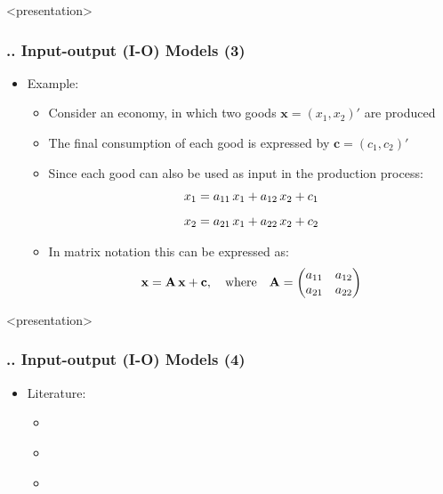 \documentclass[11pt,aspectratio=169]{beamer}
\begin{document}
\begin{frame}<presentation>
	\frametitle{{\thesection.\thesubsection.\thesubsubsection} Input-output (I-O) Models (3)}	
	\begin{itemize}
	\item Example:
	\begin{itemize}		
		\item Consider an economy, in which two goods $\mathbf{x}=(x_1,x_2)'$ are produced
		\item The final consumption of each good is expressed by $\mathbf{c}=(c_1,c_2)'$
		\item Since each good can also be used as input in the production process: 
		$$ x_1=a_{11} \thinspace x_1 + a_{12} \thinspace x_2 + c_1 $$
		$$ x_2=a_{21} \thinspace x_1 + a_{22} \thinspace x_2 + c_2 $$
		\item In matrix notation this can be expressed as:
		$$ \mathbf{x}=\mathbf{A} \thinspace \mathbf{x} +\mathbf{c},\quad \text{where} \quad \mathbf{A} = \begin{pmatrix} a_{11} & a_{12} \\ a_{21} & a_{22} \end{pmatrix}$$
	\end{itemize}
	\end{itemize}	
\end{frame}
\begin{frame}<presentation>
	\frametitle{{\thesection.\thesubsection.\thesubsubsection} Input-output (I-O) Models (4)}	
	\begin{itemize}
		\item Literature:
		\begin{itemize}		
			\item \cite{liping2010bin}
			\item \cite{lenzen2011}
			\item \cite{pan2001kraines}
		\end{itemize}
	\end{itemize}	
\end{frame}
\end{document}
